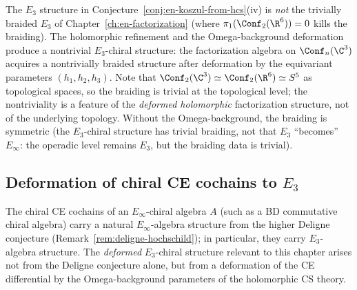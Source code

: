 \begin{remark}
\label{rem:e3-not-symmetric}
The $E_3$ structure in Conjecture~\ref{conj:en-koszul-from-hcs}(iv) is \emph{not} the trivially braided $E_3$ of Chapter~\ref{ch:en-factorization} (where $\pi_1(\Conf_2(\R^6)) = 0$ kills the braiding). The holomorphic refinement and the Omega-background deformation produce a nontrivial $E_3$-chiral structure: the factorization algebra on $\Conf_n(\C^3)$ acquires a nontrivially braided structure after deformation by the equivariant parameters $(h_1, h_2, h_3)$. Note that $\Conf_2(\C^3) \simeq \Conf_2(\R^6) \simeq S^5$ as topological spaces, so the braiding is trivial at the topological level; the nontriviality is a feature of the \emph{deformed holomorphic} factorization structure, not of the underlying topology. Without the Omega-background, the braiding is symmetric (the $E_3$-chiral structure has trivial braiding, not that $E_3$ ``becomes'' $E_\infty$: the operadic level remains $E_3$, but the braiding data is trivial).
\end{remark}

\subsection{Deformation of chiral CE cochains to \texorpdfstring{$E_3$}{E-3}}
\label{subsec:ce-deformation-e3}

The chiral CE cochains of an $E_\infty$-chiral algebra $A$ (such as a BD commutative chiral algebra) carry a natural $E_\infty$-algebra structure from the higher Deligne conjecture (Remark~\ref{rem:deligne-hochschild}); in particular, they carry $E_3$-algebra structure. The \emph{deformed} $E_3$-chiral structure relevant to this chapter arises not from the Deligne conjecture alone, but from a deformation of the CE differential by the Omega-background parameters of the holomorphic CS theory.

